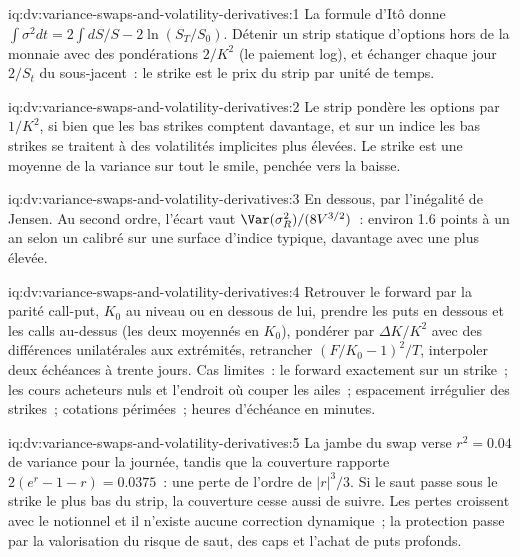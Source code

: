 \begin{solution}{iq:dv:variance-swaps-and-volatility-derivatives:1}
La formule d'Itô donne $\int\sigma^2dt=2\int dS/S-2\ln(S_T/S_0)$. Détenir un strip statique d'options hors de la monnaie
avec des pondérations $2/K^2$ (le paiement log), et échanger chaque jour $2/S_t$ du sous-jacent~: le strike est le prix du strip
par unité de temps.
\end{solution}

\begin{solution}{iq:dv:variance-swaps-and-volatility-derivatives:2}
Le strip pondère les options par $1/K^2$, si bien que les bas strikes comptent davantage, et sur un indice les bas strikes se traitent à des
volatilités implicites plus élevées. Le strike est une moyenne de la variance sur tout le smile, penchée vers la baisse.
\end{solution}

\begin{solution}{iq:dv:variance-swaps-and-volatility-derivatives:3}
En dessous, par l'inégalité de Jensen. Au second ordre, l'écart vaut $\Var(\sigma_R^2)/(8V^{3/2})$~: environ 1.6 points à un an
selon un  calibré sur une surface d'indice typique, davantage avec une  plus élevée.
\end{solution}

\begin{solution}{iq:dv:variance-swaps-and-volatility-derivatives:4}
Retrouver le forward par la parité call-put, $K_0$ au niveau ou en dessous de lui, prendre les puts en dessous et les calls au-dessus (les deux moyennés en
$K_0$), pondérer par $\Delta K/K^2$ avec des différences unilatérales aux extrémités, retrancher $(F/K_0-1)^2/T$, interpoler deux
échéances à trente jours. Cas limites~: le forward exactement sur un strike~; les cours acheteurs nuls et l'endroit où couper les ailes~; espacement
irrégulier des strikes~; cotations périmées~; heures d'échéance en minutes.
\end{solution}

\begin{solution}{iq:dv:variance-swaps-and-volatility-derivatives:5}
La jambe du swap verse $r^2=0.04$ de variance pour la journée, tandis que la couverture rapporte $2(e^r-1-r)=0.0375$~: une perte de l'ordre de
$|r|^3/3$. Si le saut passe sous le strike le plus bas du strip, la couverture cesse aussi de suivre. Les pertes croissent avec le notionnel
et il n'existe aucune correction dynamique~; la protection passe par la valorisation du risque de saut, des caps et l'achat de puts profonds.
\end{solution}

